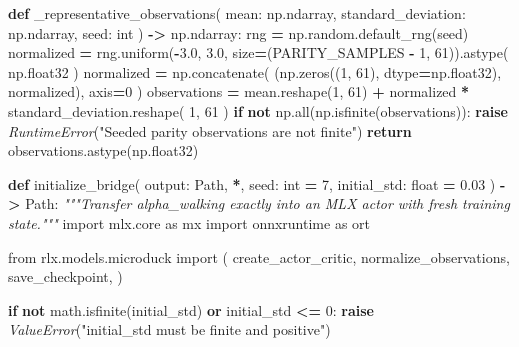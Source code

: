 \documentclass[
  chinese,
  11pt,
  letterpaper,
]{article}
\newenvironment{Shaded}{\begin{snugshade}}{\end{snugshade}}
\newcommand{\BuiltInTok}[1]{#1}
\newcommand{\CommentTok}[1]{\textcolor[rgb]{0.56,0.35,0.01}{\textit{#1}}}
\newcommand{\ControlFlowTok}[1]{\textcolor[rgb]{0.13,0.29,0.53}{\textbf{#1}}}
\newcommand{\DecValTok}[1]{\textcolor[rgb]{0.00,0.00,0.81}{#1}}
\newcommand{\FloatTok}[1]{\textcolor[rgb]{0.00,0.00,0.81}{#1}}
\newcommand{\ImportTok}[1]{#1}
\newcommand{\KeywordTok}[1]{\textcolor[rgb]{0.13,0.29,0.53}{\textbf{#1}}}
\newcommand{\NormalTok}[1]{#1}
\newcommand{\OperatorTok}[1]{\textcolor[rgb]{0.81,0.36,0.00}{\textbf{#1}}}
\newcommand{\PreprocessorTok}[1]{\textcolor[rgb]{0.56,0.35,0.01}{\textit{#1}}}
\newcommand{\StringTok}[1]{\textcolor[rgb]{0.31,0.60,0.02}{#1}}
\renewenvironment{Shaded}{\par\smallskip}{\par\smallskip}
\begin{document}
\begin{Shaded}
\begin{Highlighting}[]
\KeywordTok{def}\NormalTok{ \_representative\_observations(}
\NormalTok{    mean: np.ndarray, standard\_deviation: np.ndarray, seed: }\BuiltInTok{int}
\NormalTok{) }\OperatorTok{{-}\textgreater{}}\NormalTok{ np.ndarray:}
\NormalTok{    rng }\OperatorTok{=}\NormalTok{ np.random.default\_rng(seed)}
\NormalTok{    normalized }\OperatorTok{=}\NormalTok{ rng.uniform(}\OperatorTok{{-}}\FloatTok{3.0}\NormalTok{, }\FloatTok{3.0}\NormalTok{, size}\OperatorTok{=}\NormalTok{(PARITY\_SAMPLES }\OperatorTok{{-}} \DecValTok{1}\NormalTok{, }\DecValTok{61}\NormalTok{)).astype(}
\NormalTok{        np.float32}
\NormalTok{    )}
\NormalTok{    normalized }\OperatorTok{=}\NormalTok{ np.concatenate(}
\NormalTok{        (np.zeros((}\DecValTok{1}\NormalTok{, }\DecValTok{61}\NormalTok{), dtype}\OperatorTok{=}\NormalTok{np.float32), normalized), axis}\OperatorTok{=}\DecValTok{0}
\NormalTok{    )}
\NormalTok{    observations }\OperatorTok{=}\NormalTok{ mean.reshape(}\DecValTok{1}\NormalTok{, }\DecValTok{61}\NormalTok{) }\OperatorTok{+}\NormalTok{ normalized }\OperatorTok{*}\NormalTok{ standard\_deviation.reshape(}
        \DecValTok{1}\NormalTok{, }\DecValTok{61}
\NormalTok{    )}
    \ControlFlowTok{if} \KeywordTok{not}\NormalTok{ np.}\BuiltInTok{all}\NormalTok{(np.isfinite(observations)):}
        \ControlFlowTok{raise} \PreprocessorTok{RuntimeError}\NormalTok{(}\StringTok{"Seeded parity observations are not finite"}\NormalTok{)}
    \ControlFlowTok{return}\NormalTok{ observations.astype(np.float32)}


\KeywordTok{def}\NormalTok{ initialize\_bridge(}
\NormalTok{    output: Path, }\OperatorTok{*}\NormalTok{, seed: }\BuiltInTok{int} \OperatorTok{=} \DecValTok{7}\NormalTok{, initial\_std: }\BuiltInTok{float} \OperatorTok{=} \FloatTok{0.03}
\NormalTok{) }\OperatorTok{{-}\textgreater{}}\NormalTok{ Path:}
    \CommentTok{"""Transfer alpha\_walking exactly into an MLX actor with fresh training state."""}
    \ImportTok{import}\NormalTok{ mlx.core }\ImportTok{as}\NormalTok{ mx}
    \ImportTok{import}\NormalTok{ onnxruntime }\ImportTok{as}\NormalTok{ ort}

    \ImportTok{from}\NormalTok{ rlx.models.microduck }\ImportTok{import}\NormalTok{ (}
\NormalTok{        create\_actor\_critic,}
\NormalTok{        normalize\_observations,}
\NormalTok{        save\_checkpoint,}
\NormalTok{    )}

    \ControlFlowTok{if} \KeywordTok{not}\NormalTok{ math.isfinite(initial\_std) }\KeywordTok{or}\NormalTok{ initial\_std }\OperatorTok{\textless{}=} \DecValTok{0}\NormalTok{:}
        \ControlFlowTok{raise} \PreprocessorTok{ValueError}\NormalTok{(}\StringTok{"initial\_std must be finite and positive"}\NormalTok{)}


\end{Highlighting}
\end{Shaded}
\end{document}
